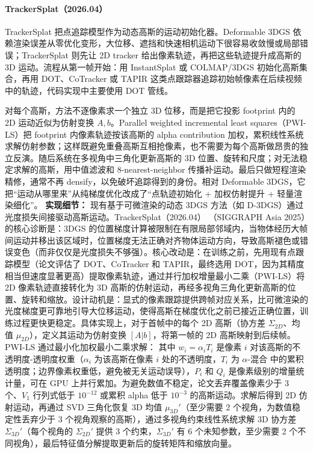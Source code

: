 \paragraph{TrackerSplat（2026.04）\cite{2604_02586}}
TrackerSplat 把点追踪模型作为动态高斯的运动初始化器。Deformable 3DGS 依赖渲染误差从零优化变形，大位移、遮挡和快速相机运动下很容易收敛慢或局部错误；TrackerSplat 则先让 2D tracker 给出像素轨迹，再把这些轨迹提升成高斯的 3D 运动。流程从第一帧开始：用 InstantSplat 或 COLMAP/3DGS 初始化高斯集合，再用 DOT、CoTracker 或 TAPIR 这类点跟踪器追踪初始帧像素在后续视频中的轨迹，代码实现中主要使用 DOT 管线。

对每个高斯，方法不逐像素求一个独立 3D 位移，而是把它投影 footprint 内的 2D 运动近似为仿射变换 $A,b$。Parallel weighted incremental least squares（PWI-LS）把 footprint 内像素轨迹按该高斯的 alpha contribution 加权，累积线性系统求解仿射参数；这样既避免重叠高斯互相抢像素，也不需要为每个高斯做昂贵的独立反演。随后系统在多视角中三角化更新高斯的 3D 位置、旋转和尺度；对无法稳定求解的高斯，用中值滤波和 8-nearest-neighbor 传播补运动。最后只做短程渲染精修，通常不再 densify，以免破坏追踪得到的身份。相对 Deformable 3DGS，它把“运动从哪里来”从纯梯度优化改成了“点轨迹初始化 + 加权仿射提升 + 轻量渲染细化”。
\textbf{实现细节：} 现有基于可微渲染的动态 3DGS 方法（如 D-3DGS）通过光度损失间接驱动高斯运动。TrackerSplat（2026.04） （SIGGRAPH Asia 2025）的核心诊断是：3DGS 的位置梯度计算被限制在有限局部邻域内，当物体经历大帧间运动并移出该区域时，位置梯度无法正确对齐物体运动方向，导致高斯褪色或错误变色（而非仅仅是光度损失不够强）。核心改动是：在训练之前，先用现有点跟踪模型（论文评估了 DOT、CoTracker 和 TAPIR，最终选用 DOT，因为其精度相当但速度显著更高）提取像素轨迹，通过并行加权增量最小二乘（PWI-LS）将 2D 像素轨迹直接转化为 3D 高斯的仿射运动，再经多视角三角化更新高斯的位置、旋转和缩放。设计动机是：显式的像素跟踪提供跨帧对应关系，比可微渲染的光度梯度更可靠地引导大位移运动，使得高斯在梯度优化之前已接近正确位置，训练过程更快更稳定。具体实现上，对于首帧中的每个 2D 高斯（协方差 $\Sigma_{2D}$、均值 $\mu_{2D}$），定义其运动为仿射变换 $[A|b]$，将第一帧的 2D 高斯映射到后续帧。PWI-LS 通过最小化加权最小二乘求解： 其中 $w_i = \alpha_i T_i$ 是像素 $i$ 对该高斯的不透明度-透明度权重（$\alpha_i$ 为该高斯在像素 $i$ 处的不透明度，$T_i$ 为 $\alpha$-混合 中的累积透明度；边界像素权重低，避免被无关运动误导），$P_i$ 和 $Q_i$ 是像素级别的增量统计量，可在 GPU 上并行累加。为避免数值不稳定，论文丢弃覆盖像素少于 3 个、$V_1$ 行列式低于 $10^{-12}$ 或累积 alpha 低于 $10^{-3}$ 的高斯运动。求解后得到 2D 仿射运动，再通过 SVD 三角化恢复 3D 均值 $\mu_{3D}'$（至少需要 2 个视角，为数值稳定性丢弃少于 3 个视角观察的高斯），通过多视角约束线性系统求解 3D 协方差 $\Sigma_{3D}'$（每个视角的 $\Sigma_{2D}'$ 提供 3 个约束，$\Sigma_{3D}'$ 有 6 个未知参数，至少需要 2 个不同视角），最后特征值分解提取更新后的旋转矩阵和缩放向量。
